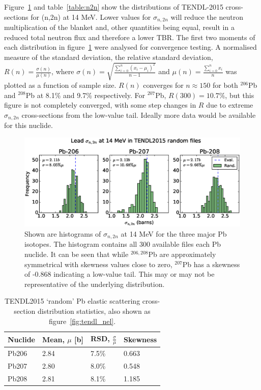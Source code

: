 Figure~\ref{fig:tendl_n2n} and table~\ref{table:n2n} show the distributions of TENDL-2015 cross-sections for (n,2n) at 14 MeV. Lower values for $\sigma_{n,2n}$ will reduce the neutron multiplication of the blanket and, other quantities being equal, result in a reduced total neutron flux and therefore a lower TBR. The first two moments of each distribution in figure~\ref{fig:tendl_n2n} were analysed for convergence testing. A normalised measure of the standard deviation, the relative standard deviation, $R(n) = \frac{\sigma(n)}{\mu(n)}$, where $\sigma(n) = \sqrt{\frac{\sum_{i=0}^{n}(x_{i}-\mu_{i})^{2}}{n-1}}$ and $\mu(n) = \frac{\sum_{i=0}^{n}x_{i}}{n}$ was plotted as a function of sample size. $R(n)$ converges for $n \approx 150$ for both $^{206}$Pb and $^{208}$Pb at 8.1\% and 9.7\% respectively. For $^{207}$Pb, $R(300)=10.7\%$, but this figure is not completely converged, with some step changes in $R$ due to extreme $\sigma_{n,2n}$ cross-sections from the low-value tail. Ideally more data would be available for this nuclide.

\begin{figure}[H]
	\includegraphics[width=\textwidth]{pb_tendl_n2n_hist}
	\caption{Shown are histograms of $\sigma_{n,2n}$ at 14 MeV for the three major Pb isotopes. The histogram contains all 300 available files each Pb nuclide. It can be seen that while $^{206,208}$Pb are approximately symmetrical with skewness values close to zero, $^{207}$Pb has a skewness of -0.868 indicating a low-value tail. This may or may not be representative of the underlying distribution.}
	\label{fig:tendl_n2n}
\end{figure}

\begin{table}[H]
  \footnotesize
  \centering 
  \begin{tabular}{llll}
    \toprule
    Nuclide & Mean, $\mu$ [b] & RSD, $\frac{\sigma}{\mu}$ & Skewness \\
    \midrule
    Pb206 & 2.84 & 7.5\% & 0.663 \\
    Pb207 & 2.80 & 8.0\% & 0.548 \\
    Pb208 & 2.81 & 8.1\% & 1.185 \\
    \bottomrule
  \end{tabular}
  \caption{TENDL2015 `random' Pb elastic scattering cross-section distribution statistics, also shown as figure~\ref{fig:tendl_nel}.}
  \label{table:nel}
\end{table}

